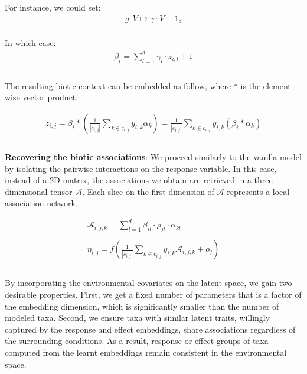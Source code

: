 \documentclass[]{article}
\begin{document}
\noindent For instance, we could set:
\begin{equation*}
\begin{matrix}
g: V \mapsto \gamma \cdot V + 1_d \\
\end{matrix}
\end{equation*}

\noindent In which case:  
\begin{equation*}
\begin{matrix}
\beta_i= \sum_{l=1}^{d} \gamma_l \cdot z_{i,l} + 1  \\\\  
\end{matrix}
\end{equation*}

\noindent The resulting biotic context can be embedded as follow, where $*$ is the element-wise vector product: 

\begin{equation*}
\begin{matrix}
z_{i,j} = \beta_i * (\frac{1}{|c_{i,j}|}\sum_{k \in c_{i,j}} y_{i,k} \alpha_{k}) = \frac{1}{|c_{i,j}|}\sum_{k \in c_{i,j}} y_{i,k} (\beta_i * \alpha_{k}) \\\\
\end{matrix}
\end{equation*}

\noindent \textbf{Recovering the biotic associations}: We proceed similarly to the vanilla model by isolating the pairwise interactions on the response variable. In this case, instead of a 2D matrix, the associations we obtain are retrieved in a three-dimensional tensor $\mathcal{A}$. Each slice on the first dimension of $\mathcal{A}$ represents a local association network.

\begin{equation*}
\begin{matrix}
\mathcal{A}_{i,j,k} = \sum_{l=1}^{d} \beta_{il} \cdot \rho_{jl} \cdot \alpha_{kl} \\\\
\eta_{i,j} = f(\frac{1}{|c_{i,j}|} \sum_{k \in c_{i,j}} y_{i,k} \mathcal{A}_{i,j,k} + o_j)\\\\
\end{matrix}
\end{equation*}

\noindent By incorporating the environmental covariates on the latent space, we gain two desirable properties. First, we get a fixed number of parameters that is a factor of the embedding dimension, which is significantly smaller than the number of modeled taxa. Second, we ensure taxa with similar latent traits, willingly captured by the response and effect embeddings, share associations regardless of the surrounding conditions. As a result, response or effect groups of taxa computed from the learnt embeddings remain consistent in the environmental space. 
\end{document}
